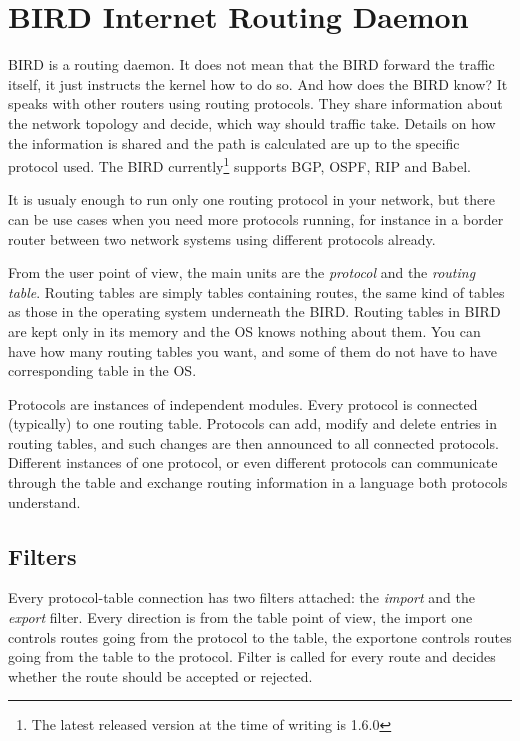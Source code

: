 \chapter{BIRD Internet Routing Daemon}

BIRD is a routing daemon. It does not mean that the BIRD forward the traffic
itself, it just instructs the kernel how to do so. And how does the BIRD know?
It speaks with other routers using routing protocols. They share information
about the network topology and decide, which way should traffic take. Details
on how the information is shared and the path is calculated are up to the
specific protocol used. The BIRD currently\footnote{The latest released version
at the time of writing is 1.6.0} supports BGP, OSPF, RIP and Babel.

It is usualy enough to run only one routing protocol in your network, but there
can be use cases when you need more protocols running, for instance in a border
router between two network systems using different protocols already.

From the user point of view, the main units are the \emph{protocol} and the
\emph{routing table}. Routing tables are simply tables containing routes, the
same kind of tables as those in the operating system underneath the BIRD.
Routing tables in BIRD are kept only in its memory and the OS knows nothing
about them. You can have how many routing tables you want, and some of them do
not have to have corresponding table in the OS.

Protocols are instances of independent modules. Every protocol is connected
(typically) to one routing table. Protocols can add, modify and delete entries
in routing tables, and such changes are then announced to all connected
protocols. Different instances of one protocol, or even different protocols can
communicate through the table and exchange routing information in a language
both protocols understand.

\section{Filters}
Every protocol-table connection has two filters attached: the \emph{import} and
the \emph{export} filter. Every direction is from the table point of view, the
import one controls routes going from the protocol to the table, the exportone
controls routes going from the table to the protocol. Filter is called for
every route and decides whether the route should be accepted or rejected.

